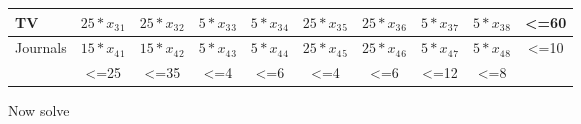 \documentclass[a4paper,11pt]{scrartcl}
\begin{document}
\begin{tabular}{|l |c| c| c| c| c| c| c| c|c|}
\hline
 TV &  \begin{math} 25* x_3{}_1 \end{math}  &  \begin{math} 25* x_3{}_2 \end{math}  & \begin{math} 5* x_3{}_3 \end{math}   & \begin{math} 5* x_3{}_4 \end{math}  &  \begin{math} 25* x_3{}_5 \end{math} &  \begin{math} 25* x_3{}_6 \end{math}  &   \begin{math} 5* x_3{}_7 \end{math} &   \begin{math} 5* x_3{}_8 \end{math} & <=60\\




\hline
 Journals &  \begin{math} 15* x_4{}_1 \end{math}  &  \begin{math} 15* x_4{}_2 \end{math}  & \begin{math} 5* x_4{}_3 \end{math}   & \begin{math} 5* x_4{}_4 \end{math}  &  \begin{math} 25* x_4{}_5 \end{math} &  \begin{math} 25* x_4{}_6 \end{math}  &   \begin{math} 5* x_4{}_7 \end{math} &   \begin{math} 5* x_4{}_8 \end{math} &<=10 \\

\hline
\hline

 &  <=25 & <=35 & <=4  &  <=6 & <=4 & <=6 & <=12 & <=8 & \\
\hline




\end{tabular}

\bigskip

Now solve  
\end{document}
